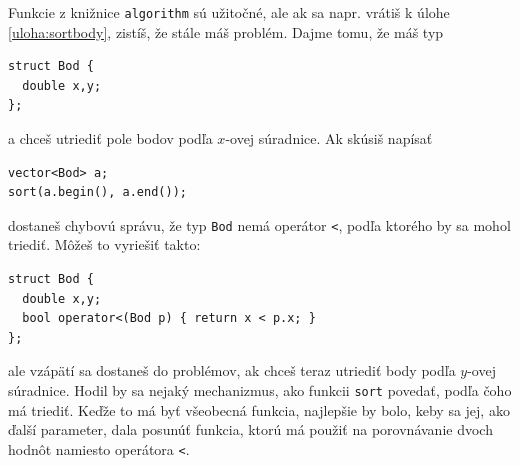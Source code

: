 \documentclass[10pt]{article}
\begin{document}
Funkcie z knižnice {\tt algorithm} sú užitočné, ale ak sa napr. vrátiš
k úlohe \ref{uloha:sortbody}, zistíš, že stále máš problém.
Dajme tomu, že máš typ
\begin{lstlisting}
struct Bod {
  double x,y;
};
\end{lstlisting}
a chceš utriediť pole bodov podľa $x$-ovej súradnice. Ak skúsiš napísať
\begin{lstlisting}
vector<Bod> a;
sort(a.begin(), a.end());
\end{lstlisting}
dostaneš chybovú správu, že typ {\tt Bod} nemá operátor {\tt <}, podľa ktorého
by sa mohol triediť. Môžeš to vyriešiť takto:
\begin{lstlisting}
struct Bod {
  double x,y;
  bool operator<(Bod p) { return x < p.x; }
};
\end{lstlisting}
ale vzápätí sa dostaneš do problémov, ak chceš teraz utriediť body podľa $y$-ovej súradnice.
Hodil by sa nejaký mechanizmus, ako funkcii {\tt sort} povedať, podľa čoho má triediť.
Keďže to má byť všeobecná funkcia, najlepšie by bolo, keby sa jej, ako ďalší
parameter, dala posunúť funkcia, ktorú má použiť na porovnávanie dvoch hodnôt
namiesto operátora {\tt <}.
\end{document}
